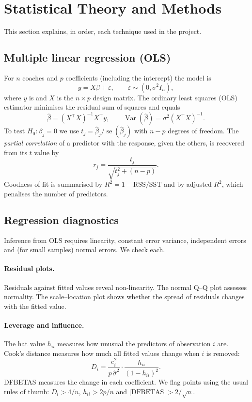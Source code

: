 \documentclass[9pt,a4paper]{article}
\newcommand{\var}[1]{\texttt{\detokenize{#1}}}
\newcommand{\Var}{\operatorname{Var}}
\begin{document}
\section{Statistical Theory and Methods}\label{sec:theory}
This section explains, in order, each technique used in the project.

\subsection{Multiple linear regression (OLS)}
For $n$ coaches and $p$ coefficients (including the intercept) the model is
\[
y = X\beta + \varepsilon,\qquad \varepsilon \sim (0,\sigma^2 I_n),
\]
where $y$ is \var{sp_rel_team} and $X$ is the $n\times p$ design matrix. The ordinary least squares (OLS) estimator minimises the residual sum of squares and equals
\[
\hat\beta = (X^\top X)^{-1}X^\top y,\qquad \Var(\hat\beta)=\sigma^2 (X^\top X)^{-1}.
\]
To test $H_0:\beta_j=0$ we use $t_j = \hat\beta_j / \operatorname{se}(\hat\beta_j)$ with $n-p$ degrees of freedom. The \emph{partial correlation} of a predictor with the response, given the others, is recovered from its $t$ value by
\[
r_{j} = \frac{t_j}{\sqrt{t_j^2 + (n-p)}}.
\]
Goodness of fit is summarised by $R^2 = 1-\mathrm{RSS}/\mathrm{SST}$ and by adjusted $R^2$, which penalises the number of predictors.

\subsection{Regression diagnostics}
Inference from OLS requires linearity, constant error variance, independent errors and (for small samples) normal errors. We check each.

\paragraph{Residual plots.} Residuals against fitted values reveal non-linearity. The normal Q--Q plot assesses normality. The scale--location plot shows whether the spread of residuals changes with the fitted value.

\paragraph{Leverage and influence.} The hat value $h_{ii}$ measures how unusual the predictors of observation $i$ are. Cook's distance measures how much all fitted values change when $i$ is removed:
\[
D_i = \frac{e_i^2}{p\,\hat\sigma^2}\cdot\frac{h_{ii}}{(1-h_{ii})^2}.
\]
DFBETAS measures the change in each coefficient. We flag points using the usual rules of thumb: $D_i > 4/n$, $h_{ii}>2p/n$ and $|\mathrm{DFBETAS}|>2/\sqrt n$.
\end{document}
